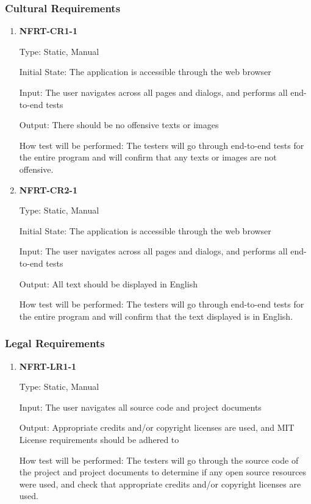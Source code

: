 \documentclass[12pt, titlepage]{article}
\begin{document}
\subsubsection{Cultural Requirements}
\begin{enumerate}
	\item \textbf{NFRT-CR1-1}

	      Type: Static, Manual

	      Initial State: The application is accessible through the web browser

	      Input: The user navigates across all pages and dialogs, and performs all end-to-end tests

	      Output: There should be no offensive texts or images

	      How test will be performed: The testers will go through end-to-end tests for the entire program and
	      will confirm that any texts or images are not offensive.

	\item \textbf{NFRT-CR2-1}

	      Type: Static, Manual

	      Initial State: The application is accessible through the web browser

	      Input: The user navigates across all pages and dialogs, and performs all end-to-end tests

	      Output: All text should be displayed in English

	      How test will be performed: The testers will go through end-to-end tests for the entire program and
	      will confirm that the text displayed is in English.

\end{enumerate}

\subsubsection{Legal Requirements}
\begin{enumerate}
	\item \textbf{NFRT-LR1-1}

	      Type: Static, Manual

	      Input: The user navigates all source code and project documents

	      Output: Appropriate credits and/or copyright licenses are used, and MIT License requirements should
	      be adhered to

	      How test will be performed: The testers will go through the source code of the project and project
	      documents to determine if any open source resources were used, and check that appropriate credits
	      and/or copyright licenses are used.

\end{enumerate}
\end{document}
